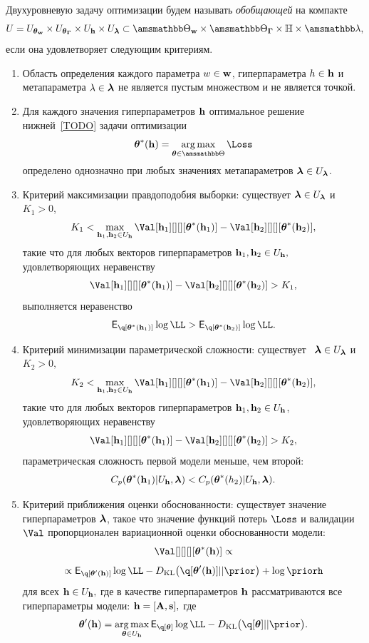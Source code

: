 \begin{defin}
Двухуровневую задачу оптимизации будем называть \textit{обобщающей} на компакте $$U = \Utetaw \times \UtetaG \times \Uh \times \Ulam \subset \Tetawb \times \TetaGb \times \Hb \times \Lamb,$$ если она удовлетворяет следующим критериям.
\begin{enumerate}
\item Область определения каждого параметра $w \in \mathbf{w}$, гиперпараметра $h \in \mathbf{h}$ и метапараметра $\lambda \in \boldsymbol{\lambda}$ не  является пустым множеством и не является точкой.
\item Для каждого значения гиперпараметров $\mathbf{h}$ оптимальное решение нижней~\eqref{TODO} задачи оптимизации 
\[
\teta^{*}(\h) = \argmax_{\teta \in \Tetab} \Loss
\]
определено однозначно при любых значениях метапараметров $\boldsymbol{\lambda} \in U_{\boldsymbol{\lambda}}$.

\item Критерий максимизации правдоподобия выборки: существует $\boldsymbol{\lambda} \in U_{\boldsymbol{\lambda}}$ и  $K_1>0$,$$K_1 < \max_{\h_1,\h_2 \in \Uh} \Val[\h_1][][][\teta^{*}(\h_1)] - \Val[\h_2][][][\teta^{*}(\h_2)],$$ такие что для любых векторов гиперпараметров $\mathbf{h}_1, \mathbf{h}_2 \in U_{\mathbf{h}},$ удовлетворяющих неравенству $$\Val[\h_1][][][\teta^{*}(\h_1)] - \Val[\h_2][][][\teta^{*}(\h_2)] > K_1,$$ выполняется неравенство $$\E_{\q[\teta^{*}(\h_1)]}\log\LL > \E_{\q[\teta^{*}(\h_2)]}\log\LL.$$

\item Критерий минимизации параметрической сложности:  существует  $\boldsymbol{\lambda} \in U_{\boldsymbol{\lambda}}$ и $K_2>0,$ $$K_2 < \max_{\h_1, \h_2 \in \Uh} \Val[\h_1][][][\teta^{*}(\h_1)] - \Val[\h_2][][][\teta^{*}(\h_2)],$$ такие что для любых векторов гиперпараметров $\mathbf{h}_1,\mathbf{h}_2 \in U_{\mathbf{h}}$, удовлетворяющих неравенству $$\Val[\h_1][][][\teta^{*}(\h_1)] - \Val[\h_2][][][\teta^{*}(\h_2)]>K_2,$$ параметрическая сложность первой модели меньше, чем второй: $$C_p(\boldsymbol{\theta}^{*}(\mathbf{h}_1)|U_{\mathbf{h}},\boldsymbol{\lambda})<C_p(\boldsymbol{\theta}^{*}(h_2)|U_{\mathbf{h}},\boldsymbol{\lambda}).$$

\item Критерий приближения оценки обоснованности: существует значение гиперпараметров $\boldsymbol{\lambda}$, такое что значение функций потерь $\Loss$ и валидации $\Val$ пропорционален вариационной оценки обоснованности модели: $$\Val[][][][\teta^{*}(\h)] \propto $$
$$\propto
\E_{\q[\teta'(\h)]}\log\LL - \KL{\q[\teta'(\h)]}{\prior} + \log\priorh$$ для всех $\mathbf{h} \in U_{\mathbf{h}},$
где в качестве гиперпараметров $\mathbf{h}$ рассматриваются все гиперпараметры модели: $\mathbf{h} = [\mathbf{A}, \mathbf{s}],$
где $$\teta'(\h) = \argmax_{\teta \in \Uh} \E_{\q[\teta]}\log\LL - \KL{\q[\teta]}{\prior}.$$


\end{enumerate}
\end{defin}

